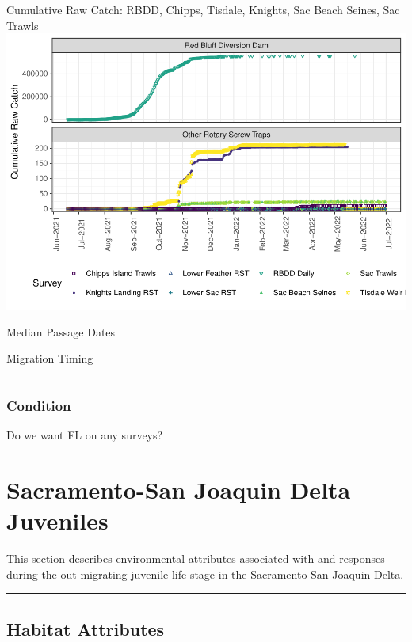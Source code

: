 \documentclass[
]{book}
\theoremstyle{definition}
\theoremstyle{definition}
\theoremstyle{definition}
\theoremstyle{definition}
\theoremstyle{remark}
\begin{document}
Cumulative Raw Catch: RBDD, Chipps, Tisdale, Knights, Sac Beach Seines, Sac Trawls
\includegraphics{_main_files/figure-latex/juvtiming-fig-1.pdf}

Median Passage Dates

Migration Timing

\begin{center}\rule{0.5\linewidth}{0.5pt}\end{center}

\hypertarget{condition-1}{%
\subsection{Condition}\label{condition-1}}

Do we want FL on any surveys?

\hypertarget{sacramento-san-joaquin-delta-juveniles}{%
\chapter{Sacramento-San Joaquin Delta Juveniles}\label{sacramento-san-joaquin-delta-juveniles}}

This section describes environmental attributes associated with and responses during the out-migrating juvenile life stage in the Sacramento-San Joaquin Delta.

\begin{center}\rule{0.5\linewidth}{0.5pt}\end{center}

\hypertarget{habitat-attributes-3}{%
\section{Habitat Attributes}\label{habitat-attributes-3}}
\end{document}
